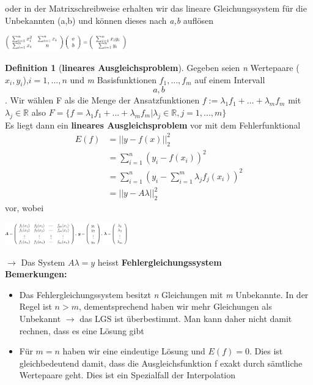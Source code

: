 \documentclass{article}
\newenvironment{Figure}
	{\par\medskip\noindent\minipage{\linewidth}}
	{\endminipage\par\medskip}
\theoremstyle{satz}
\theoremstyle{definition}
\newtheorem{definition}{Definition}
\begin{document}
oder in der Matrixschreibweise erhalten wir das lineare Gleichungssystem für die Unbekannten (a,b) und können dieses nach \textit{a,b} auflösen
\begin{Figure}
\centering
\includegraphics[width=200px]{img/LineareAusgleichsproblemeMatrix.png}
	\label{fig:Matrixschreibweise von linearen Ausgleichsprobleme}
\end{Figure}

\theoremstyle{definition}
\begin{tcolorbox}
\begin{definition}[\textbf{lineares Ausgleichsproblem}]
Gegeben seien \textit{n} Wertepaare ($x_i, y_i$),$i = 1, ..., n$ und \textit{m} Basisfunktionen $f_1, ..., f_m$ auf einem Intervall \[a,b\]. Wir wählen F als die Menge der Ansatzfunktionen $f:= \lambda_1 f_1 + ... + \lambda_m f_m$ mit $\lambda_j \in \mathbb{R}$ also $ F=\{f = \lambda_1 f_1 + ... + \lambda_m f_m | \lambda_j \in \mathbb{R}, j = 1, ..., m\}$\\
Es liegt dann ein \textbf{lineares Ausgleichsproblem} vor mit dem Fehlerfunktional
\begin{equation}
	\begin{split}
	E(f) &= || y - f(x) ||^2_2 \\
		&= \sum\limits_{i=1}^n (y_i - f(x_i))^2 \\
		&= \sum\limits_{i=1}^n (y_i - \sum\limits_{i=1}^m \lambda_j f_j (x_i))^2 \\
		&= || y - A \lambda||^2_2
\end{split}
\end{equation}
vor, wobei
\begin{Figure}
\centering
\includegraphics[width=200px]{img/LineareAusgleichsproblemeDefinitionMatrix.png}
	\label{fig:Matrixschreibweise}
\end{Figure}
$\rightarrow$ Das System $A \lambda = y$ heisst \textbf{Fehlergleichungssystem}\\
\textbf{Bemerkungen: }
\begin{itemize}
	\item Das Fehlergleichungssystem besitzt \textit{n} Gleichungen mit \textit{m} Unbekannte. In der Regel ist $n>m$, dementsprechend haben wir mehr Gleichungen als Unbekannt $\rightarrow$ das LGS ist überbestimmt. Man kann daher nicht damit rechnen, dass es eine Lösung gibt
	\item Für $m=n$ haben wir eine eindeutige Lösung und $E(f) = 0$. Dies ist gleichbedeutend damit, dass die Ausgleichsfunktion f exakt durch sämtliche Wertepaare geht. Dies ist ein Spezialfall der Interpolation
\end{itemize}
\end{definition}
\end{tcolorbox}
\end{document}
